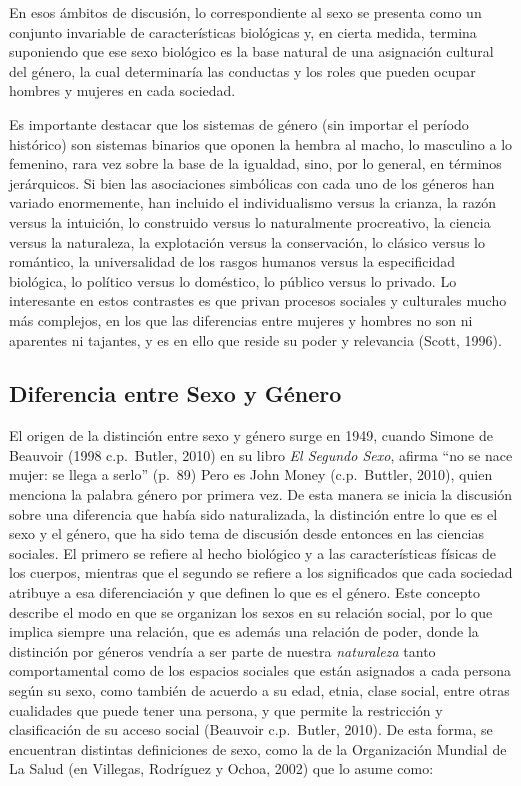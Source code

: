 En esos ámbitos de discusión, lo correspondiente al sexo se presenta como un
conjunto invariable de características biológicas y, en cierta medida, termina
suponiendo que ese sexo biológico es la base natural de una asignación cultural
del género, la cual determinaría las conductas y los roles que pueden ocupar
hombres y mujeres en cada sociedad.

Es importante destacar que los sistemas de género (sin importar el período
histórico) son sistemas binarios que oponen la hembra al macho, lo masculino a
lo femenino, rara vez sobre la base de la igualdad, sino, por lo general, en
términos jerárquicos.
Si bien las asociaciones simbólicas con cada uno de los géneros han variado
enormemente, han incluido el individualismo versus la crianza, la razón versus
la intuición, lo construido versus lo naturalmente procreativo, la ciencia
versus la naturaleza, la explotación versus la conservación, lo clásico versus
lo romántico, la universalidad de los rasgos humanos versus la especificidad
biológica, lo político versus lo doméstico, lo público versus lo privado.
Lo interesante en estos contrastes es que privan procesos sociales y culturales
mucho más complejos, en los que las diferencias entre mujeres y hombres no son
ni aparentes ni tajantes, y es en ello que reside su poder y relevancia (Scott,
1996).

\subsection{Diferencia entre Sexo y Género}
El origen de la distinción entre sexo y género surge en 1949, cuando Simone de
Beauvoir (1998 c.p.~Butler, 2010) en su libro \emph{El Segundo Sexo}, afirma “no
se nace mujer: se llega a serlo” (p.~89)
Pero es John Money (c.p.~Buttler, 2010), quien menciona la palabra género por
primera vez.
De esta manera se inicia la discusión sobre una diferencia que había sido
naturalizada, la distinción entre lo que es el sexo y el género, que ha sido
tema de discusión desde entonces en las ciencias sociales.
El primero se refiere al hecho biológico y a las características físicas de los
cuerpos, mientras que el segundo se refiere a los significados que cada sociedad
atribuye a esa diferenciación y que definen lo que es el género.
Este concepto describe el modo en que se organizan los sexos en su relación
social, por lo que implica siempre una relación, que es además una relación de
poder, donde la distinción por géneros vendría a ser parte de nuestra
\emph{naturaleza} tanto comportamental como de los espacios sociales que están
asignados a cada persona según su sexo, como también de acuerdo a su edad,
etnia, clase social, entre otras cualidades que puede tener una persona, y que
permite la restricción y clasificación de su acceso social (Beauvoir
c.p.~Butler, 2010).
De esta forma, se encuentran distintas definiciones de sexo, como la de la
Organización Mundial de La Salud (en Villegas, Rodríguez y Ochoa, 2002) que lo
asume como:

